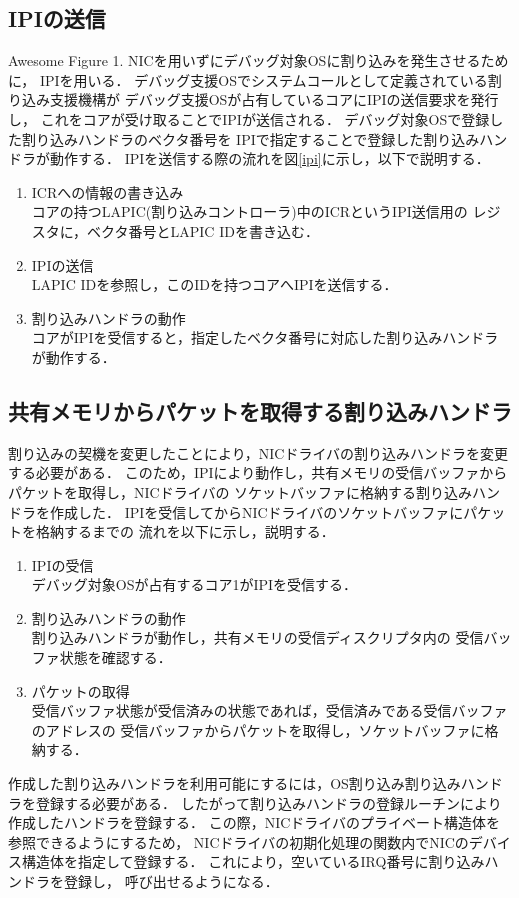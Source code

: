 \documentclass[tanilab-enum]{graduate}
\begin{document}
\subsection{IPIの送信}
{Awesome Figure 1.}
NICを用いずにデバッグ対象OSに割り込みを発生させるために，
IPIを用いる．
デバッグ支援OSでシステムコールとして定義されている割り込み支援機構が
デバッグ支援OSが占有しているコアにIPIの送信要求を発行し，
これをコアが受け取ることでIPIが送信される．
デバッグ対象OSで登録した割り込みハンドラのベクタ番号を
IPIで指定することで登録した割り込みハンドラが動作する．
IPIを送信する際の流れを図\ref{ipi}に示し，以下で説明する．
\begin{enumerate}
    \item ICRへの情報の書き込み\\
        コアの持つLAPIC(割り込みコントローラ)中のICRというIPI送信用の
        レジスタに，ベクタ番号とLAPIC IDを書き込む．
    \item IPIの送信\\
        LAPIC IDを参照し，このIDを持つコアへIPIを送信する．
    \item 割り込みハンドラの動作\\
        コアがIPIを受信すると，指定したベクタ番号に対応した割り込みハンドラが動作する．
\end{enumerate}
\subsection{共有メモリからパケットを取得する割り込みハンドラ}\label{handler}
割り込みの契機を変更したことにより，NICドライバの割り込みハンドラを変更する必要がある．
このため，IPIにより動作し，共有メモリの受信バッファからパケットを取得し，NICドライバの
ソケットバッファに格納する割り込みハンドラを作成した．
IPIを受信してからNICドライバのソケットバッファにパケットを格納するまでの
流れを以下に示し，説明する．
\begin{enumerate}
    \item IPIの受信\\
        デバッグ対象OSが占有するコア1がIPIを受信する．
    \item 割り込みハンドラの動作\\
        割り込みハンドラが動作し，共有メモリの受信ディスクリプタ内の
        受信バッファ状態を確認する．
    \item パケットの取得\\
        受信バッファ状態が受信済みの状態であれば，受信済みである受信バッファのアドレスの
        受信バッファからパケットを取得し，ソケットバッファに格納する．
\end{enumerate}
作成した割り込みハンドラを利用可能にするには，OS割り込み割り込みハンドラを登録する必要がある．
したがって割り込みハンドラの登録ルーチンにより作成したハンドラを登録する．
この際，NICドライバのプライベート構造体を参照できるようにするため，
NICドライバの初期化処理の関数内でNICのデバイス構造体を指定して登録する．
これにより，空いているIRQ番号に割り込みハンドラを登録し，
呼び出せるようになる．
\end{document}

